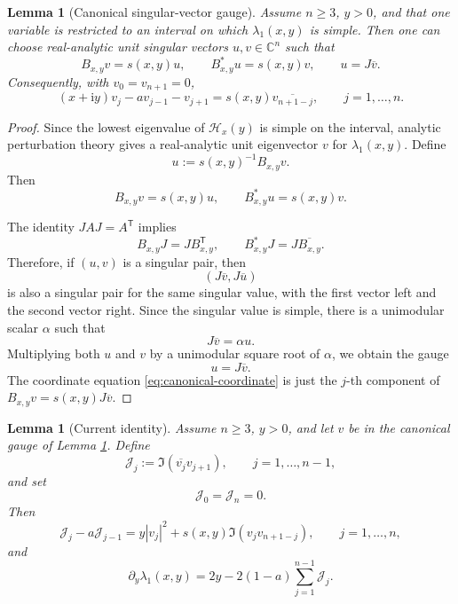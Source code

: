 \documentclass[11pt]{amsart}
\numberwithin{equation}{section}
\newcommand{\C}{\mathbb C}
\newcommand{\ii}{\mathrm i}
\newtheorem{lemma}[theorem]{Lemma}
\begin{document}
\begin{lemma}[Canonical singular-vector gauge]\label{lem:canonical-gauge}
Assume \(n\ge3\), \(y>0\), and that one variable is restricted to an interval on which \(\lambda_1(x,y)\) is simple.  Then one can choose real-analytic unit singular vectors \(u,v\in\C^n\) such that
\[
B_{x,y}v=s(x,y)u,
\qquad
B_{x,y}^*u=s(x,y)v,
\qquad
u=J\overline v.
\]
Consequently, with \(v_0=v_{n+1}=0\),
\begin{equation}\label{eq:canonical-coordinate}
(x+\ii y)v_j-av_{j-1}-v_{j+1}
=
s(x,y)\overline{v_{n+1-j}},
\qquad
j=1,\dots,n.
\end{equation}
\end{lemma}

\begin{proof}
Since the lowest eigenvalue of \(\mathcal H_x(y)\) is simple on the interval, analytic perturbation theory gives a real-analytic unit eigenvector \(v\) for \(\lambda_1(x,y)\).  Define
\[
u:=s(x,y)^{-1}B_{x,y}v.
\]
Then
\[
B_{x,y}v=s(x,y)u,
\qquad
B_{x,y}^*u=s(x,y)v.
\]

The identity \(JAJ=A^{\mathsf T}\) implies
\[
B_{x,y}J=JB_{x,y}^{\mathsf T},
\qquad
B_{x,y}^*J=J\overline{B_{x,y}}.
\]
Therefore, if \((u,v)\) is a singular pair, then
\[
(J\overline v,J\overline u)
\]
is also a singular pair for the same singular value, with the first vector left and the second vector right.  Since the singular value is simple, there is a unimodular scalar \(\alpha\) such that
\[
J\overline v=\alpha u.
\]
Multiplying both \(u\) and \(v\) by a unimodular square root of \(\alpha\), we obtain the gauge
\[
u=J\overline v.
\]
The coordinate equation \eqref{eq:canonical-coordinate} is just the \(j\)-th component of \(B_{x,y}v=s(x,y)J\overline v\).
\end{proof}

\begin{lemma}[Current identity]\label{lem:current-identity}
Assume \(n\ge3\), \(y>0\), and let \(v\) be in the canonical gauge of Lemma \ref{lem:canonical-gauge}.  Define
\[
\mathcal J_j:=\Im(\overline{v_j}v_{j+1}),
\qquad
j=1,\dots,n-1,
\]
and set
\[
\mathcal J_0=\mathcal J_n=0.
\]
Then
\begin{equation}\label{eq:current-identity}
\mathcal J_j-a\mathcal J_{j-1}
=
y|v_j|^2+s(x,y)\Im(v_jv_{n+1-j}),
\qquad
j=1,\dots,n,
\end{equation}
and
\begin{equation}\label{eq:lambda-y-current}
\partial_y\lambda_1(x,y)
=
2y-2(1-a)\sum_{j=1}^{n-1}\mathcal J_j.
\end{equation}
\end{lemma}
\end{document}
